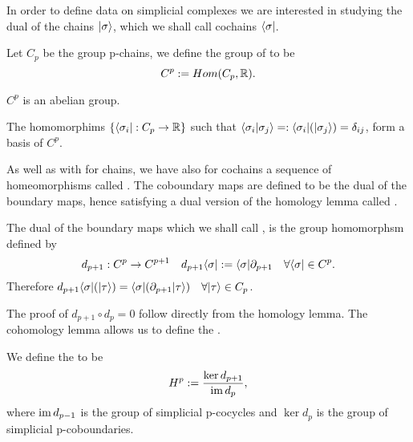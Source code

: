 \documentclass[../1.tex]{subfiles}
\begin{document}
    In order to define data on simplicial complexes we are interested in studying the dual of the chains $| \sigma \rangle$,
    which we shall call cochains $\langle \sigma |$.
       
    \begin{defn}
        Let $C_p$ be the group p-chains, we define the group of  to 
        be \[C^p := Hom(C_p, \mathbb{R}).\]
    \end{defn}

    \begin{prop}
        $C^p$ is an abelian group.
    \end{prop}

    \begin{prop}
        The homomorphims $\{\langle \sigma_i |:C_p \to \mathbb{R}\}$ such that $\langle \sigma_i | \sigma_j \rangle =: \langle \sigma_i |(| \sigma_j \rangle) = \delta_{ij}$,
        form a basis of $C^p$.
    \end{prop}

    As well as with for chains, we have also for cochains a sequence of homeomorphisms called . The coboundary maps are defined
    to be the dual of the boundary maps, hence satisfying a dual version of the homology lemma called .

    \begin{defn}
        \label{dualrel}
        The dual of the boundary maps which we shall call
        , is the group homomorphsm defined by
        \[ d_{p+1} : C^p \to C^{p+1} \quad d_{p+1}\langle \sigma | := \langle \sigma | \partial_{p+1} \quad \forall \langle \sigma | \in C^p.\]
        Therefore $d_{p+1}\langle \sigma |(| \tau \rangle) = \langle \sigma | (\partial_{p+1}| \tau \rangle) \quad \forall | \tau \rangle \in C_p$.
    \end{defn}

    The proof of $d_{p+1} \circ d_p = 0$ follow directly from the homology lemma. The cohomology lemma allows us to define the .
    
    \begin{defn}
        We define the  to be 
        \[H^p := \frac{\ker d_{p+1}}{\mathrm{im}\, d_{p}},\] 
        where $\mathrm{im}\, d_{p-1}$ is the group of simplicial p-cocycles and
        $\ker d_p$ is the group of simplicial p-coboundaries.
    \end{defn}

\end{document}
